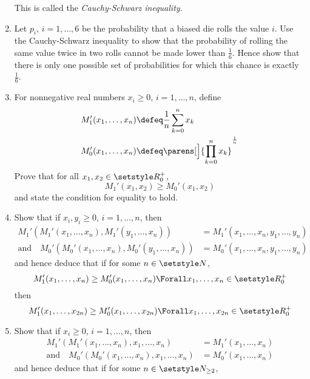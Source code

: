 \begin{enumerate}
  This is called the \emph{Cauchy-Schwarz inequality}.
 \item
  Let \(p_i\), \(i = 1, \dotsc, 6\) be the probability that a biased die rolls
  the value \(i\). Use the Cauchy-Schwarz inequality to show that the
  probability of rolling the same value twice in two rolls cannot be made lower
  than \(\frac 16\). Hence show that there is only one possible set of
  probabilities for which this chance is exactly \(\frac 16\).
 \item
  For nonnegative real numbers \(x_i \ge 0\), \(i = 1, \dotsc, n\), define
  \begin{align*}
   M_1'(x_1, \dotsc, x_n) &\defeq
   \frac 1n \sum_{k = 0}^n x_k \\
   M_0'(x_1, \dotsc, x_n) &\defeq
   \parens[\Big]{
    \prod_{k = 0}^n x_k
   }^{\frac 1n}
  \end{align*}
  Prove that for all \(x_1, x_2 \in \Reals_0^+\),
  \begin{equation*}
   M_1'(x_1, x_2) \ge M_0'(x_1, x_2)
  \end{equation*}
  and state the condition for equality to hold.
 \item
  Show that if \(x_i, y_i \ge 0\), \(i = 1, \dotsc, n\), then
  \begin{align*}
   M_1'(M_1'(x_1, \dotsc, x_n), M_1'(y_1, \dotsc, x_n)) &=
   M_1'(x_1, \dotsc, x_n, y_1, \dotsc, y_n) \\
   \text{and}\quad
   M_0'(M_0'(x_1, \dotsc, x_n), M_0'(y_1, \dotsc, x_n)) &=
   M_0'(x_1, \dotsc, x_n, y_1, \dotsc, y_n)
  \end{align*}
  and hence deduce that if for some \(n \in \Naturals\),
  \begin{equation*}
   M_1'(x_1, \dotsc, x_n) \ge M_0'(x_1, \dotsc, x_n)
    \Forall x_1, \dotsc, x_n \in \Reals_0^+
  \end{equation*}
  then
  \begin{equation*}
   M_1'(x_1, \dotsc, x_{2n}) \ge M_0'(x_1, \dotsc, x_{2n})
    \Forall x_1, \dotsc, x_{2n} \in \Reals_0^+
  \end{equation*}
 \item
  Show that if \(x_i \ge 0\), \(i = 1, \dotsc, n\), then
  \begin{align*}
   M_1'(M_1'(x_1, \dotsc, x_n), x_1, \dotsc, x_n) &=
   M_1'(x_1, \dotsc, x_n) \\
   \text{and}\quad
   M_0'(M_0'(x_1, \dotsc, x_n), x_1, \dotsc, x_n) &=
   M_0'(x_1, \dotsc, x_n)
  \end{align*}
  and hence deduce that if for some \(n \in \Naturals_{\ge 2}\),

\end{enumerate}

